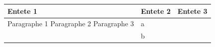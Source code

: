 \documentclass[11pt,a4paper]{article}
\begin{document}
\begin{table}[h]
\begin{tabular}{|l|l|l|}
\hline
Entete 1 & Entete 2 & Entete 3 \\ \hline
Paragraphe 1  Paragraphe 2  Paragraphe 3 & a &  \\ \hline
 & b &  \\ \hline
\end{tabular}
\end{table}
\end{document}
